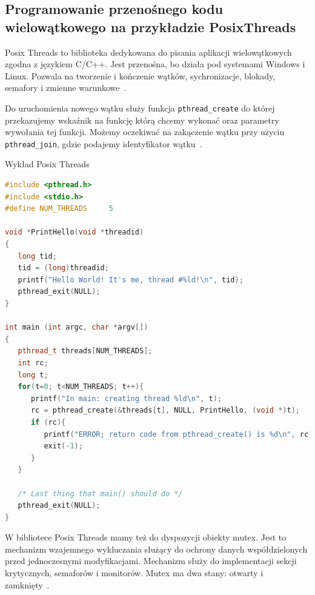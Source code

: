 \documentclass[wi]{zut}
\begin{document}

\subsection{Programowanie przenośnego kodu wielowątkowego na przykładzie PosixThreads}

Posix Threads to biblioteka dedykowana do pisania aplikacji wielowątkowych zgodna z językiem C/C++. Jest przenośna, bo działa pod systemami Windows i Linux. Pozwala na tworzenie i kończenie wątków, sychronizacje, blokady, semafory i zmienne warunkowe~\cite{Palkowski_POSIX}.

Do uruchomienia nowego wątku służy funkcja \lstinline{pthread_create} do której przekazujemy wskaźnik na funkcję którą chcemy wykonać oraz parametry wywołania tej funkcji. Możemy oczekiwać na zakączenie wątku przy użyciu \lstinline{pthread_join}, gdzie podajemy identyfikator wątku~\cite{Palkowski_POSIX}.

{Wykład Posix Threads \cite{Palkowski_POSIX}}{\label{kod:przyklad}}
\begin{lstlisting}[language=C++]
#include <pthread.h>
#include <stdio.h>
#define NUM_THREADS     5

void *PrintHello(void *threadid)
{
   long tid;
   tid = (long)threadid;
   printf("Hello World! It's me, thread #%ld!\n", tid);
   pthread_exit(NULL);
}

int main (int argc, char *argv[])
{
   pthread_t threads[NUM_THREADS];
   int rc;
   long t;
   for(t=0; t<NUM_THREADS; t++){
      printf("In main: creating thread %ld\n", t);
      rc = pthread_create(&threads[t], NULL, PrintHello, (void *)t);
      if (rc){
         printf("ERROR; return code from pthread_create() is %d\n", rc);
         exit(-1);
      }
   }

   /* Last thing that main() should do */
   pthread_exit(NULL);
}
\end{lstlisting}

W bibliotece Posix Threads mamy też do dyspozycji obiekty mutex. Jest to mechanizm wzajemnego wykluczania służący do ochrony danych współdzielonych przed jednoczesnymi modyfikacjami. Mechanizm służy do implementacji sekcji krytycznych, semaforów i monitorów. Mutex ma dwa stany: otwarty i zamknięty~\cite{Palkowski_POSIX}.
\end{document}
